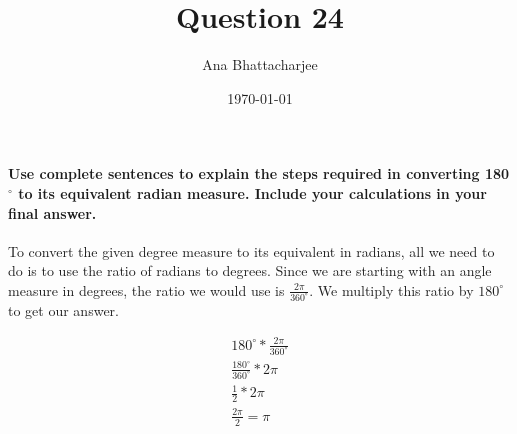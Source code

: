 \documentclass{article}
\begin{document}
\title{Question 24}
\author{Ana Bhattacharjee}
\date{\today}
\maketitle{}


\paragraph{Use complete sentences to explain the steps required in converting 180$^\circ$ to its equivalent radian measure. Include your calculations in your final answer.}

To convert the given degree measure to its equivalent in radians,  all we need to do is to use the ratio of radians to degrees. Since we are starting with an angle measure in degrees, the ratio we would use is $ \frac{2 \pi}{360^\circ}$. We multiply this ratio by $180^\circ$ to get our answer.

\begin{align}
  180^\circ * \frac{2 \pi}{360^\circ} \\
  \frac{180^\circ}{360^\circ} * 2\pi \\
  \frac{1}{2} * 2\pi \\
  \frac{2 \pi}{2} = \pi
\end{align}
\end{document}
